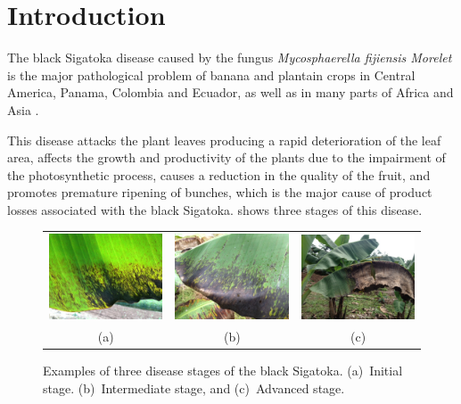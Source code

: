 \section{Introduction}

The black Sigatoka disease caused by the fungus \emph{Mycosphaerella
  fijiensis Morelet} is the major pathological problem of banana and
plantain crops in Central America, Panama, Colombia and Ecuador, as well as in
many parts of Africa and Asia \citep{MarinVargas1995}.

This disease attacks the plant leaves producing a rapid deterioration
of the leaf area, affects the growth and productivity of the plants
due to the impairment of the photosynthetic process, causes a
reduction in the quality of the fruit, and promotes premature
ripening of bunches, which is
the major cause of product losses associated with the black
Sigatoka.  shows three stages of
this disease.
	 
\begin{figure}[ht] 
\centering
\begin{tabular}{c@{\;}c@{\;}c}
  \includegraphics[width=.32\linewidth]{Roya_a} &
  \includegraphics[width=.32\linewidth]{Roya_b} &
  \includegraphics[width=.32\linewidth]{Roya_c} \\
  (a) & (b) & (c) 
\end{tabular}
\caption{Examples of three disease stages of the black Sigatoka. 
(a)~Initial stage. (b)~Intermediate stage, and (c)~Advanced stage.} 
\label{fig:diseasestages} 
\end{figure}

